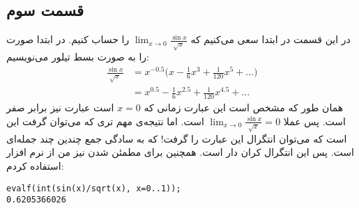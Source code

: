 \documentclass[]{article}
\begin{document}
\subsection*{قسمت سوم}
در این قسمت در ابتدا سعی می‌کنیم که
$\lim_{x \rightarrow 0} \frac{\sin x}{\sqrt{x}}$
را حساب کنیم. در ابتدا صورت را به صورت بسط تیلور می‌نویسیم:
\begin{align*}
    \frac{\sin x}{\sqrt{x}} &=  x^{-0.5} \bigl(x -\frac{1}{6} x^{3}+\frac{1}{120} x^{5}+\dots\bigr)\\
    &= x^{0.5} -\frac{1}{6} x^{2.5}+\frac{1}{120} x^{4.5}+\dots
\end{align*}
همان طور که مشخص است این عبارت زمانی که
$x = 0$
است عبارت نیز برابر صفر است. پس عملا
$\lim_{x \rightarrow 0} \frac{\sin x}{\sqrt{x}} = 0$
است. اما نتیجه‌ی مهم تری که می‌توان گرفت این است که می‌توان انتگرال این عبارت را گرفت! که به سادگی
جمع چندین چند جمله‌ای است. پس این انتگرال کران دار است. همچنین برای مطمئن شدن نیز من از نرم
افزار
استفاده کردم:
\begin{latin}
\centering
\texttt{evalf(int(sin(x)/sqrt(x), x=0..1));}\\
\texttt{0.6205366026}
\end{latin}
\end{document}
